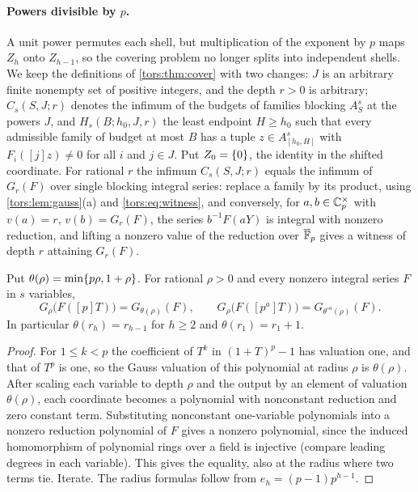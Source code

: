 \paragraph{Powers divisible by $p$.}
A unit power permutes each shell, but multiplication of the exponent by $p$ maps $Z_h$ onto
$Z_{h-1}$, so the covering problem no longer splits into independent shells. We keep the
definitions of \cref{tors:thm:cover} with two changes: $J$ is an arbitrary finite nonempty
set of positive integers, and the depth $r>0$ is arbitrary; $C_s(S,J;r)$ denotes the
infimum of the budgets of families blocking $A_S^s$ at the powers $J$, and $H_s(B;h_0,J,r)$
the least endpoint $H\ge h_0$ such that every admissible family of budget at most $B$ has a
tuple $z\in A_{[h_0,H]}^s$ with $F_i([j]z)\ne0$ for all $i$ and $j\in J$. Put $Z_0=\{0\}$,
the identity in the shifted coordinate. For rational $r$ the infimum $C_s(S,J;r)$ equals the
infimum of $G_r(F)$ over single blocking integral series: replace a family by its product,
using \cref{tors:lem:gauss}(a) and \eqref{tors:eq:witness}, and conversely, for $a,b\in\mathbb{C}_p^\times$
with $v(a)=r$, $v(b)=G_r(F)$, the series $b^{-1}F(aY)$ is integral with nonzero reduction, and
lifting a nonzero value of the reduction over $\overline{\mathbb{F}}_p$ gives a witness of depth $r$
attaining $G_r(F)$.

\begin{lemma}\label{cost:lem:transport}
Put $\theta(\rho)=\min\{p\rho,1+\rho\}$. For rational $\rho>0$ and every nonzero integral
series $F$ in $s$ variables,
\[
 G_\rho\bigl(F([p]T)\bigr)=G_{\theta(\rho)}(F),\qquad
 G_\rho\bigl(F([p^a]T)\bigr)=G_{\theta^{\circ a}(\rho)}(F).
\]
In particular $\theta(r_h)=r_{h-1}$ for $h\ge2$ and $\theta(r_1)=r_1+1$.
\end{lemma}

\begin{proof}
For $1\le k<p$ the coefficient of $T^k$ in $(1+T)^p-1$ has valuation one, and that of $T^p$
is one, so the Gauss valuation of this polynomial at radius $\rho$ is $\theta(\rho)$. After
scaling each variable to depth $\rho$ and the output by an element of valuation
$\theta(\rho)$, each coordinate becomes a polynomial with nonconstant reduction and zero
constant term. Substituting nonconstant one-variable polynomials into a nonzero reduction
polynomial of $F$ gives a nonzero polynomial, since the induced homomorphism of polynomial
rings over a field is injective (compare leading degrees in each variable). This gives the
equality, also at the radius where two terms tie. Iterate. The radius formulas follow from
$e_h=(p-1)p^{h-1}$.
\end{proof}

